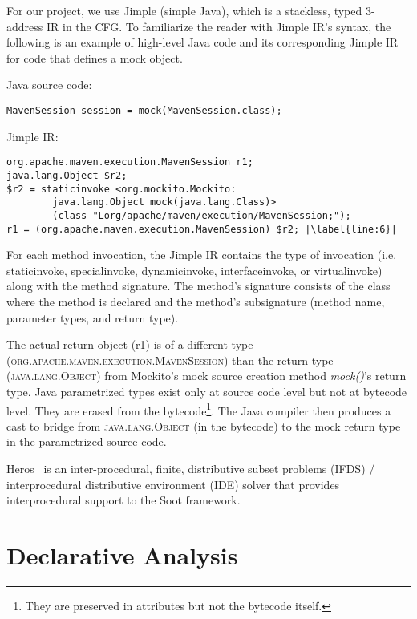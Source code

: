 For our project, we use Jimple (simple Java), which is a stackless, typed 3-address IR in the CFG. To familiarize the reader with Jimple IR's syntax, the following is an example of high-level Java code and its corresponding Jimple IR for code that defines a mock object.

Java source code:
\begin{lstlisting}[basicstyle=\linespread{1.0}\ttfamily\small,numbers=none]
MavenSession session = mock(MavenSession.class);
\end{lstlisting}

Jimple IR:
\begin{lstlisting}[basicstyle=\linespread{1.0}\ttfamily\small,escapechar=|,numbers=none]
org.apache.maven.execution.MavenSession r1;
java.lang.Object $r2;
$r2 = staticinvoke <org.mockito.Mockito:
		java.lang.Object mock(java.lang.Class)>
		(class "Lorg/apache/maven/execution/MavenSession;");
r1 = (org.apache.maven.execution.MavenSession) $r2; |\label{line:6}|
\end{lstlisting}

For each method invocation, the Jimple IR contains the type of invocation (i.e. staticinvoke, specialinvoke, dynamicinvoke, interfaceinvoke, or virtualinvoke) along with the method signature. The method's signature consists of the class where the method is declared and the method's subsignature (method name, parameter types, and return type).

The actual return object (r1) is of a different type \\ (\textsc{org.apache.maven.execution.MavenSession}) than the return type \\ (\textsc{java.lang.Object}) from Mockito's mock source creation method \textit{mock()}'s return type. Java parametrized types exist only at source code level but not at bytecode level. They are erased from the bytecode\footnote{They are preserved in attributes but not the bytecode itself.}.
The Java compiler then produces a cast to bridge from \textsc{java.lang.Object} (in the bytecode) to the mock return type in the parametrized source code.

Heros~\cite{bodden12:_inter_proced_data_flow_analy} is an inter-procedural, finite, distributive subset problems (IFDS) / interprocedural distributive environment (IDE) solver that provides interprocedural support to the Soot framework.

\section{Declarative Analysis}

